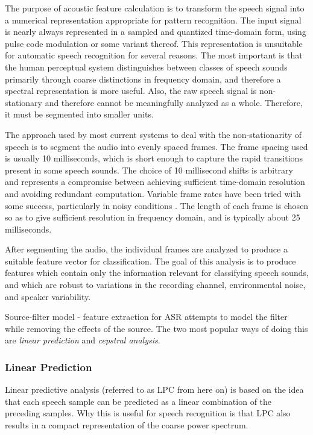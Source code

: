 \documentclass{article}
\begin{document}
The purpose of acoustic feature calculation is to transform the speech
signal into a numerical representation appropriate for pattern
recognition.  The input signal is nearly always represented in a
sampled and quantized time-domain form, using pulse code modulation or
some variant thereof.  This representation is unsuitable for automatic
speech recognition for several reasons.  The most important is that
the human perceptual system distinguishes between classes of speech
sounds primarily through coarse distinctions in frequency domain, and
therefore a spectral representation is more useful.  Also, the raw
speech signal is non-stationary and therefore cannot be meaningfully
analyzed as a whole.  Therefore, it must be segmented into smaller
units.

The approach used by most current systems to deal with the
non-stationarity of speech is to segment the audio into evenly spaced
frames.  The frame spacing used is usually 10 milliseconds, which is
short enough to capture the rapid transitions present in some speech
sounds.  The choice of 10 millisecond shifts is arbitrary and
represents a compromise between achieving sufficient time-domain
resolution and avoiding redundant computation.  Variable frame rates
have been tried with some success, particularly in noisy conditions
\cite{zhu2000}.  The length of each frame is chosen so as to give
sufficient resolution in frequency domain, and is typically about 25
milliseconds.

After segmenting the audio, the individual frames are analyzed to
produce a suitable feature vector for classification.  The goal of
this analysis is to produce features which contain only the
information relevant for classifying speech sounds, and which are
robust to variations in the recording channel, environmental noise,
and speaker variability.

Source-filter model - feature extraction for ASR attempts to model the
filter while removing the effects of the source.  The two most popular
ways of doing this are {\em linear prediction} and {\em cepstral
  analysis}.

\subsubsection{Linear Prediction}
\label{sec:lpc}

Linear predictive analysis (referred to as LPC from here on) is based
on the idea that each speech sample can be predicted as a linear
combination of the preceding samples.  Why this is useful for speech
recognition is that LPC also results in a compact representation of
the coarse power spectrum.
\end{document}

